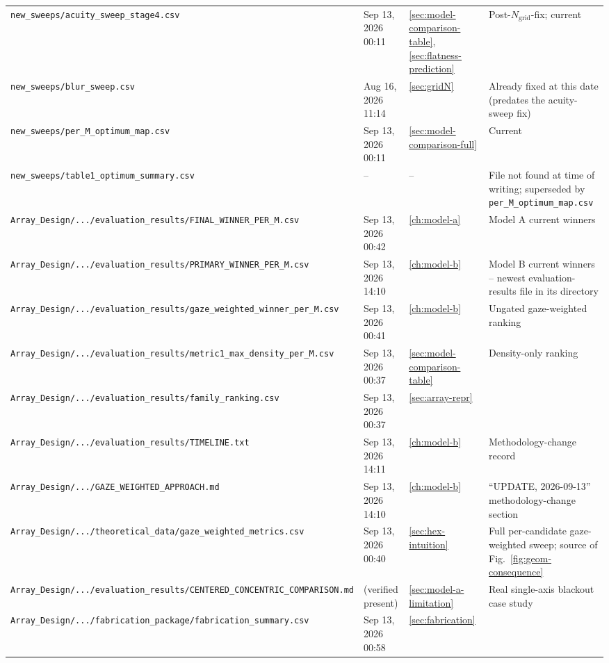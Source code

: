 \begin{longtable}{p{5.8cm}p{2.4cm}p{1.2cm}p{5.4cm}}
\texttt{new\_sweeps/acuity\_sweep\_stage4.csv} & Sep 13, 2026 00:11 & \ref{sec:model-comparison-table},\ref{sec:flatness-prediction} & Post-$N_{\mathrm{grid}}$-fix; current \\
\texttt{new\_sweeps/blur\_sweep.csv} & Aug 16, 2026 11:14 & \ref{sec:gridN} & Already fixed at this date (predates the acuity-sweep fix) \\
\texttt{new\_sweeps/per\_M\_optimum\_map.csv} & Sep 13, 2026 00:11 & \ref{sec:model-comparison-full} & Current \\
\texttt{new\_sweeps/table1\_optimum\_summary.csv} & -- & -- & File not found at time of writing; superseded by \texttt{per\_M\_optimum\_map.csv} \\
\texttt{Array\_Design/.../evaluation\_results/FINAL\_WINNER\_PER\_M.csv} & Sep 13, 2026 00:42 & \ref{ch:model-a} & Model A current winners \\
\texttt{Array\_Design/.../evaluation\_results/PRIMARY\_WINNER\_PER\_M.csv} & Sep 13, 2026 14:10 & \ref{ch:model-b} & Model B current winners -- newest evaluation-results file in its directory \\
\texttt{Array\_Design/.../evaluation\_results/gaze\_weighted\_winner\_per\_M.csv} & Sep 13, 2026 00:41 & \ref{ch:model-b} & Ungated gaze-weighted ranking \\
\texttt{Array\_Design/.../evaluation\_results/metric1\_max\_density\_per\_M.csv} & Sep 13, 2026 00:37 & \ref{sec:model-comparison-table} & Density-only ranking \\
\texttt{Array\_Design/.../evaluation\_results/family\_ranking.csv} & Sep 13, 2026 00:37 & \ref{sec:array-repr} & \\
\texttt{Array\_Design/.../evaluation\_results/TIMELINE.txt} & Sep 13, 2026 14:11 & \ref{ch:model-b} & Methodology-change record \\
\texttt{Array\_Design/.../GAZE\_WEIGHTED\_APPROACH.md} & Sep 13, 2026 14:10 & \ref{ch:model-b} & ``UPDATE, 2026-09-13'' methodology-change section \\
\texttt{Array\_Design/.../theoretical\_data/gaze\_weighted\_metrics.csv} & Sep 13, 2026 00:40 & \ref{sec:hex-intuition} & Full per-candidate gaze-weighted sweep; source of Fig.~\ref{fig:geom-consequence} \\
\texttt{Array\_Design/.../evaluation\_results/CENTERED\_CONCENTRIC\_COMPARISON.md} & (verified present) & \ref{sec:model-a-limitation} & Real single-axis blackout case study \\
\texttt{Array\_Design/.../fabrication\_package/fabrication\_summary.csv} & Sep 13, 2026 00:58 & \ref{sec:fabrication} & \\

\end{longtable}
